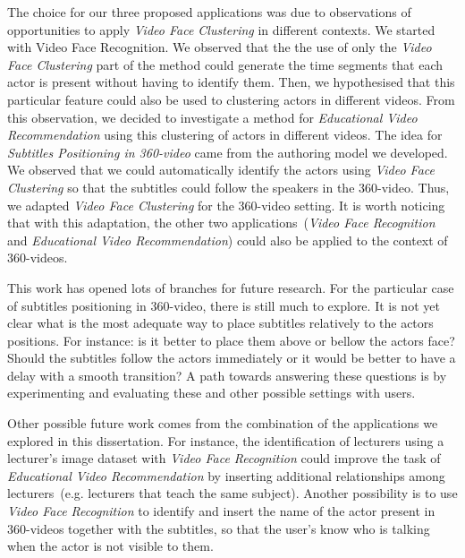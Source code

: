 The choice for our three proposed applications was due to observations of opportunities to apply \emph{Video Face Clustering} in different contexts. We started with Video Face Recognition. We observed that the the use of only the \emph{Video Face Clustering} part of the method could generate the time segments that each actor is present without having to identify them. Then, we hypothesised that this particular feature could also be used to clustering actors in different videos. From this observation, we decided to investigate a method for \emph{Educational Video Recommendation} using this clustering of actors in different videos. The idea for \emph{Subtitles Positioning in 360-video} came from the authoring model we developed. We observed that we could automatically identify the actors using \emph{Video Face Clustering} so that the subtitles could follow the speakers in the 360-video. Thus, we adapted \emph{Video Face Clustering} for the 360-video setting. It is worth noticing that with this adaptation, the other two applications~(\emph{Video Face Recognition} and \emph{Educational Video Recommendation}) could also be applied to the context of 360-videos.

This work has opened lots of branches for future research. For the particular case of subtitles positioning in 360-video, there is still much to explore. It is not yet clear what is the most adequate way to place subtitles relatively to the actors positions. For instance: is it better to place them above or bellow the actors face? Should the subtitles follow the actors immediately or it would be better to have a delay with a smooth transition? A path towards answering these questions is by experimenting and evaluating these and other possible settings with users.

Other possible future work comes from the combination of the applications we explored in this dissertation. For instance, the identification of lecturers using a lecturer's image dataset with \emph{Video Face Recognition} could improve the task of \emph{Educational Video Recommendation} by inserting additional relationships among lecturers~(e.g. lecturers that teach the same subject). Another possibility is to use \emph{Video Face Recognition} to identify and insert the name of the actor present in 360-videos together with the subtitles, so that the user's know who is talking when the actor is not visible to them.

